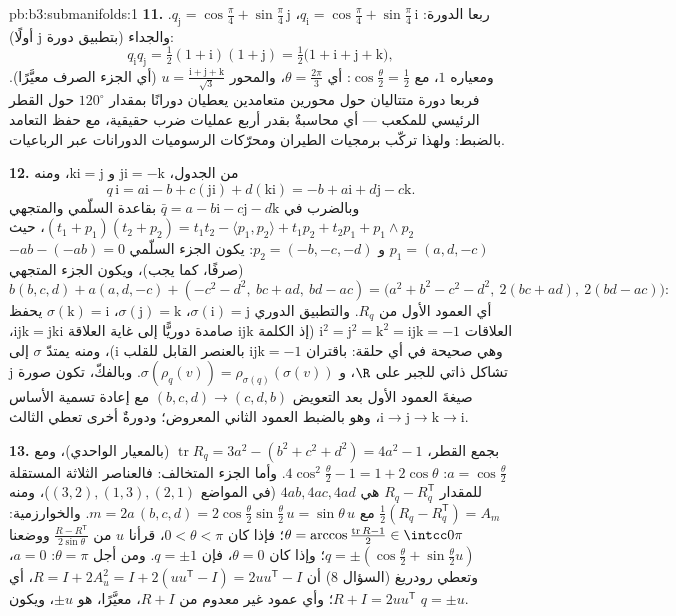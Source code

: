 \begin{solution}{pb:b3:submanifolds:1}
\textbf{11.} ربعا الدورة: $q_{\mathrm i} =
\cos\frac\pi4 + \sin\frac\pi4\,\mathrm i$، $q_{\mathrm j} =
\cos\frac\pi4 + \sin\frac\pi4\,\mathrm j$. والجداء (بتطبيق
دورة $\mathrm j$ أولًا):
\[
q_{\mathrm i}q_{\mathrm j} = \tfrac12(1 + \mathrm i)(1 +
\mathrm j) = \tfrac12\bigl(1 + \mathrm i + \mathrm j +
\mathrm k\bigr),
\]
ومعياره $1$، مع $\cos\frac\theta2 = \frac12$: أي $\theta =
\frac{2\pi}3$، والمحور $u = \frac{\mathrm i + \mathrm j +
\mathrm k}{\sqrt3}$ (أي الجزء
الصرف معيَّرًا). فربعا دورة متتاليان حول محورين متعامدين
يعطيان دورانًا بمقدار $120^\circ$ حول القطر الرئيسي للمكعب ---
أي محاسبةٌ بقدر أربع عمليات ضرب حقيقية، مع حفظ التعامد
بالضبط: ولهذا تركّب برمجيات الطيران ومحرّكات الرسوميات
الدورانات عبر الرباعيات.

\textbf{12.} من الجدول، $\mathrm{ji} = -\mathrm k$ و $\mathrm{ki} = \mathrm j$، ومنه
\[
q\,\mathrm i = a\mathrm i - b + c(\mathrm{ji}) +
d(\mathrm{ki}) = -b + a\mathrm i + d\mathrm j - c\mathrm k .
\]
وبالضرب في $\bar q = a - b\mathrm i - c\mathrm j -
d\mathrm k$ بقاعدة السلّمي والمتجهي $(t_1 + p_1)(t_2 +
p_2) = t_1t_2 - \langle p_1, p_2\rangle + t_1p_2 + t_2p_1 +
p_1\wedge p_2$، حيث $p_1 = (a, d, -c)$
و $p_2 = (-b, -c,
-d)$: يكون الجزء السلّمي $-ab - (-ab) = 0$ (صرفًا، كما يجب)، ويكون
الجزء المتجهي
\[
b(b, c, d) + a(a, d, -c) + (-c^2 - d^2,\ bc + ad,\ bd - ac)
= \bigl(a^2 + b^2 - c^2 - d^2,\ 2(bc + ad),\ 2(bd -
ac)\bigr):
\]
أي العمود الأول من $R_q$. والتطبيق الدوري $\sigma(\mathrm i)
= \mathrm j$، $\sigma(\mathrm j) = \mathrm k$،
$\sigma(\mathrm k) = \mathrm i$ يحفظ العلاقات $\mathrm i^2 = \mathrm j^2 = \mathrm k^2 = \mathrm{ijk} =
-1$ (إذ الكلمة $\mathrm{ijk}$ صامدة
دوريًّا إلى غاية العلاقة $\mathrm{ijk} = \mathrm{jki}$، وهي صحيحة في أي حلقة: باقتران
$\mathrm{ijk} = -1$ بالعنصر القابل للقلب $\mathrm i$)، ومنه يمتدّ $\sigma$
إلى تشاكل ذاتي للجبر على $\R$، و $\sigma(\rho_q(v)) =
\rho_{\sigma(q)}(\sigma(v))$. وبالفكّ، تكون صورة
$\mathrm j$ صيغةَ العمود الأول بعد التعويض $(b, c, d) \to (c, d, b)$ مع إعادة
تسمية الأساس $\mathrm i \to \mathrm j \to \mathrm k \to \mathrm
i$، وهو بالضبط العمود الثاني المعروض؛ ودورةٌ
أخرى تعطي الثالث.

\textbf{13.} بجمع القطر، $\operatorname{tr}R_q =
3a^2 - (b^2 + c^2 + d^2) = 4a^2 - 1$ (بالمعيار الواحدي)، ومع $a = \cos\frac\theta2$:
$4\cos^2\frac\theta2 - 1 = 1 +
2\cos\theta$. وأما الجزء المتخالف: فالعناصر الثلاثة المستقلة للمقدار
$R_q - R_q^{\mathsf T}$ هي $4ab, 4ac, 4ad$ (في المواضع $(3,2), (1,3), (2,1)$)، ومنه $\frac12(R_q -
R_q^{\mathsf T}) = A_m$
مع $m = 2a\,(b, c, d) =
2\cos\frac\theta2\sin\frac\theta2\,u = \sin\theta\,u$. والخوارزمية: $\theta = \arccos\frac{\operatorname{tr}R -
1}{2} \in \intcc0\pi$؛ فإذا كان $0 < \theta < \pi$، قرأنا $u$
من $\frac{R - R^{\mathsf T}}{2\sin\theta}$ ووضعنا $q =
\pm(\cos\frac\theta2 + \sin\frac\theta2 u)$؛ وإذا كان $\theta =
0$، فإن $q = \pm1$.
ومن أجل $\theta = \pi$: $a = 0$، وتعطي رودريغ (السؤال 8) أن
$R = I + 2A_u^2 = I + 2(uu^{\mathsf T} -
I) = 2uu^{\mathsf T} - I$، أي $R + I = 2uu^{\mathsf T}$؛ وأي عمود غير معدوم من $R + I$، معيَّرًا،
هو $\pm u$، ويكون $q = \pm u$.


\end{solution}
